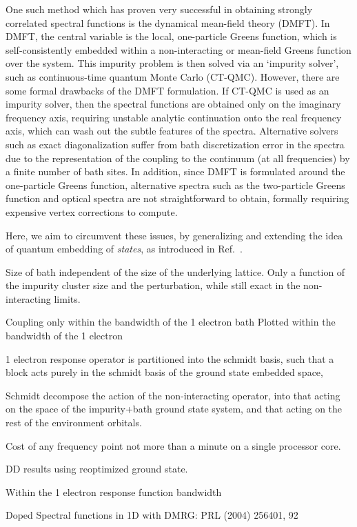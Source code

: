 \documentclass[aps,showpacs,twocolumn,nobibnotes]{revtex4}
\begin{document}
One such method which has proven very successful in obtaining strongly correlated spectral functions is the dynamical mean-field theory (DMFT). In DMFT, the central variable is the
local, one-particle Greens function, which is self-consistently embedded within a non-interacting or mean-field Greens function over the system. This impurity problem is then solved via
an `impurity solver', such as continuous-time quantum Monte Carlo (CT-QMC). However, there are some formal drawbacks of the DMFT formulation. If CT-QMC is used as an impurity solver, then
the spectral functions are obtained only on the imaginary frequency axis, requiring unstable analytic continuation onto the real frequency axis, which can wash out the subtle features of the spectra. Alternative solvers such as exact diagonalization
suffer from bath discretization error in the spectra due to the representation of the coupling to the continuum (at all frequencies) by a finite number of bath sites. In addition, since DMFT
is formulated around the one-particle Greens function, alternative spectra such as the two-particle Greens function and optical spectra are not straightforward to obtain, formally 
requiring expensive vertex corrections to compute\cite{Millis2012}.

Here, we aim to circumvent these issues, by generalizing and extending the idea of quantum embedding of {\em states}, as introduced in Ref.~. 

Size of bath independent of the size of the underlying lattice. Only a function of the impurity cluster size and the perturbation, while still exact in the non-interacting limits.

Coupling only within the bandwidth of the 1 electron bath
Plotted within the bandwidth of the 1 electron 

1 electron response operator is partitioned into the schmidt basis, such that a block acts purely in the schmidt basis of the ground state embedded space, 

Schmidt decompose the action of the non-interacting operator, into that acting on the space of the impurity+bath ground state system, and that acting on the rest of the environment orbitals.

Cost of any frequency point not more than a minute on a single processor core.

DD results using reoptimized ground state.

Within the 1 electron response function bandwidth

Doped Spectral functions in 1D with DMRG: PRL (2004) 256401, 92
\end{document}
